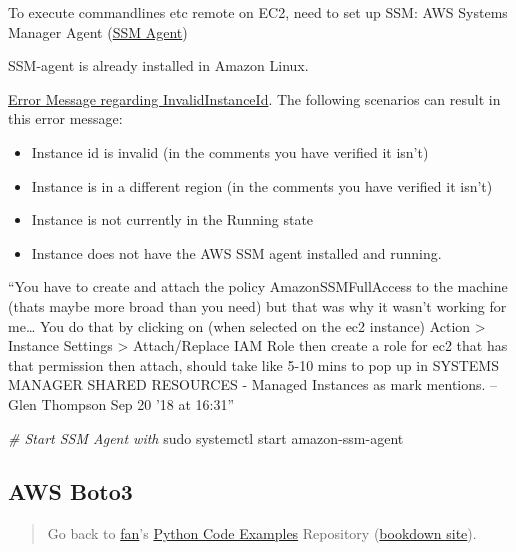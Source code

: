 \documentclass[
]{book}
\newenvironment{Shaded}{\begin{snugshade}}{\end{snugshade}}
\newcommand{\CommentTok}[1]{\textcolor[rgb]{0.56,0.35,0.01}{\textit{#1}}}
\newcommand{\FunctionTok}[1]{\textcolor[rgb]{0.00,0.00,0.00}{#1}}
\newcommand{\NormalTok}[1]{#1}
\providecommand{\tightlist}{%
  \setlength{\itemsep}{0pt}\setlength{\parskip}{0pt}}
\begin{document}
To execute commandlines etc remote on EC2, need to set up SSM: AWS Systems Manager Agent (\href{https://docs.aws.amazon.com/systems-manager/latest/userguide/ssm-agent.html}{SSM Agent})

SSM-agent is already installed in Amazon Linux.

\href{https://stackoverflow.com/questions/47034797/invalidinstanceid-an-error-occurred-invalidinstanceid-when-calling-the-sendco}{Error Message regarding InvalidInstanceId}. The following scenarios can result in this error message:

\begin{itemize}
\tightlist
\item
  Instance id is invalid (in the comments you have verified it isn't)
\item
  Instance is in a different region (in the comments you have verified it isn't)
\item
  Instance is not currently in the Running state
\item
  Instance does not have the AWS SSM agent installed and running.
\end{itemize}

``You have to create and attach the policy AmazonSSMFullAccess to the machine (thats maybe more broad than you need) but that was why it wasn't working for me\ldots{} You do that by clicking on (when selected on the ec2 instance) Action \textgreater{} Instance Settings \textgreater{} Attach/Replace IAM Role then create a role for ec2 that has that permission then attach, should take like 5-10 mins to pop up in SYSTEMS MANAGER SHARED RESOURCES - Managed Instances as mark mentions. -- Glen Thompson Sep 20 '18 at 16:31''

\begin{Shaded}
\begin{Highlighting}[]
\CommentTok{\# Start SSM Agent with}
\FunctionTok{sudo}\NormalTok{ systemctl start amazon{-}ssm{-}agent}
\end{Highlighting}
\end{Shaded}

\hypertarget{aws-boto3}{%
\subsection{AWS Boto3}\label{aws-boto3}}

\begin{quote}
Go back to \href{http://fanwangecon.github.io/}{fan}'s \href{https://fanwangecon.github.io/pyfan/}{Python Code Examples} Repository (\href{https://fanwangecon.github.io/pyfan/bookdown}{bookdown site}).
\end{quote}
\end{document}
